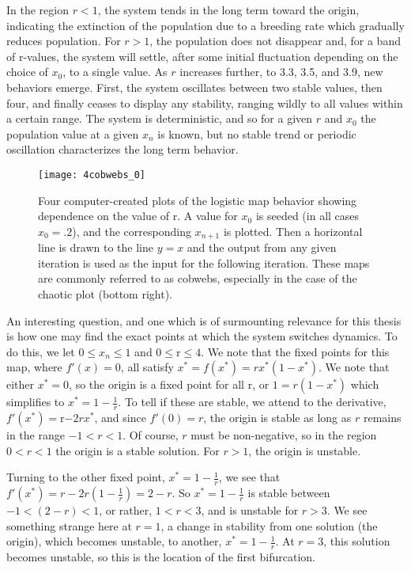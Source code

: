 \documentclass[12pt,twoside]{reedthesis}
\begin{document}
In the region $r < 1$, the system tends in the long term toward the origin, indicating the extinction of the population due to a breeding rate which gradually reduces population.  For $r > 1$, the population does not disappear and, for a band of r-values, the system will settle, after some initial fluctuation depending on the choice of $x_0$, to a single value.  As $r$ increases further, to 3.3, 3.5, and 3.9, new behaviors emerge.  First, the system oscillates between two stable values, then four, and finally ceases to display any stability, ranging wildly to all values within a certain range.  The system is deterministic, and so for a given $r$ and $x_0$ the population value at a given $x_n$ is known, but no stable trend or periodic oscillation characterizes the long term behavior.  

\begin{figure}[h]
\centering
\texttt{[image: 4cobwebs\_0]} 
\caption{Four computer-created plots of the logistic map behavior showing dependence on the value of r.  A value for $x_0$ is seeded (in all cases $x_0 = .2$), and the corresponding $x_{n+1}$ is plotted.  Then a horizontal line is drawn to the line $y = x$ and the output from any given iteration is used as the input for the following iteration.  These maps are commonly referred to as cobwebs, especially in the case of the chaotic plot (bottom right). }
\label{cobwebs_test}
\end{figure}
\clearpage 


An interesting question, and one which is of surmounting relevance for this thesis is how one may find the exact points at which the system switches dynamics.  To do this, we let $0 \leq x_n \leq 1$ and $ 0 \leq $r$ \leq 4$.  We note that the fixed points for this map, where $f'(x) = 0$, all satisfy $x^* = f(x^*) = rx^*(1-x^*)$.  We note that either $x^* = 0$, so the origin is a fixed point for all r, or $1 = r(1-x^*)$ which simplifies to $x^* = 1-\frac{1}{r}$.  To tell if these are stable, we attend to the derivative, $f'(x^*) = $r$ - 2rx^*$, and since $f'(0) = r$, the origin is stable as long as $r$ remains in the range $-1<r<1$.  Of course, $r$ must be non-negative, so in the region $0<r<1$ the origin is a stable solution.  For $r>1$, the origin is unstable.  




Turning to the other fixed point, $x^* = 1-\frac{1}{r}$, we see that $f'(x^*) = r - 2r(1-\frac{1}{r}) = 2 - r$.  So $x^* = 1 - \frac{1}{r}$ is stable between $ -1 < (2-r) < 1$, or rather,  $1 < r < 3$, and is unstable for $r > 3$.  We see something strange here at $r = 1$, a change in stability from one solution (the origin), which becomes unstable, to another, $x^* = 1 - \frac{1}{r}$.  At $r = 3$, this solution becomes unstable, so this is the location of the first bifurcation.  
\end{document}
